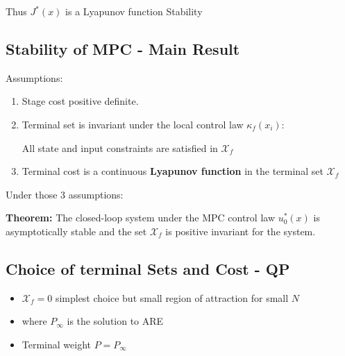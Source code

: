\documentclass[8pt,a4paper]{scrartcl}
\begin{document}
\begin{multicols*}{3}
Thus $J^\ast(x)$ is a Lyapunov function \dahe Stability



\subsection{Stability of MPC - Main Result}

Assumptions:

\begin{enumerate}
\ncompaq
\item Stage cost positive definite.
\item Terminal set is invariant under the local control law $\kappa_f(x_i)$:


All state and input constraints are satisfied in $\mathcal{X}_f$

\item Terminal cost is a continuous \textbf{Lyapunov function} in the terminal set $\mathcal{X}_f$

\end{enumerate}

Under those 3 assumptions:

\textbf{Theorem:} The closed-loop system under the MPC control law $u_0^\ast(x)$ is asymptotically stable and the set $\mathcal{X}_f$ is positive invariant for the system.

\subsection{Choice of terminal Sets and Cost - QP}

\begin{itemize}
\item $\mathcal{X}_f=0$ simplest choice but small region of attraction for small $N$
\item {}

where $P_\infty$ is the solution to ARE

\item Terminal weight $P=P_\infty$


\end{itemize}
\end{multicols*}
\end{document}
